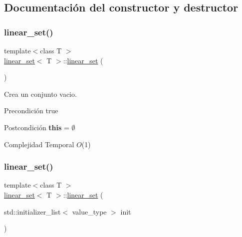 \subsection{Documentación del constructor y destructor}
\mbox{\label{classlinear__set_a6d872f648b8f79012ad962ad852f8ae7}} 
\subsubsection{\texorpdfstring{linear\+\_\+set()}{linear\_set()}\hspace{0.1cm}{\footnotesize\ttfamily [1/4]}}
{\footnotesize\ttfamily template$<$class T $>$ \\
\mbox{\hyperlink{classlinear__set}{linear\+\_\+set}}$<$ T $>$\+::\mbox{\hyperlink{classlinear__set}{linear\+\_\+set}} (\begin{DoxyParamCaption}{ }\end{DoxyParamCaption})}



Crea un conjunto vacio. 

\begin{DoxyPrecond}{Precondición}
true 
\end{DoxyPrecond}
\begin{DoxyPostcond}{Postcondición}
{\bfseries this} = $\emptyset$
\end{DoxyPostcond}

\begin{DoxyDescription}
\item[Complejidad Temporal]$O$(1)
\end{DoxyDescription}\mbox{\label{classlinear__set_aa99e56c1ec649af8f0fa8c681d31fcb6}} 
\subsubsection{\texorpdfstring{linear\+\_\+set()}{linear\_set()}\hspace{0.1cm}{\footnotesize\ttfamily [2/4]}}
{\footnotesize\ttfamily template$<$class T $>$ \\
\mbox{\hyperlink{classlinear__set}{linear\+\_\+set}}$<$ T $>$\+::\mbox{\hyperlink{classlinear__set}{linear\+\_\+set}} (\begin{DoxyParamCaption}\item[{std\+::initializer\+\_\+list$<$ value\+\_\+type $>$}]{init }\end{DoxyParamCaption})}




